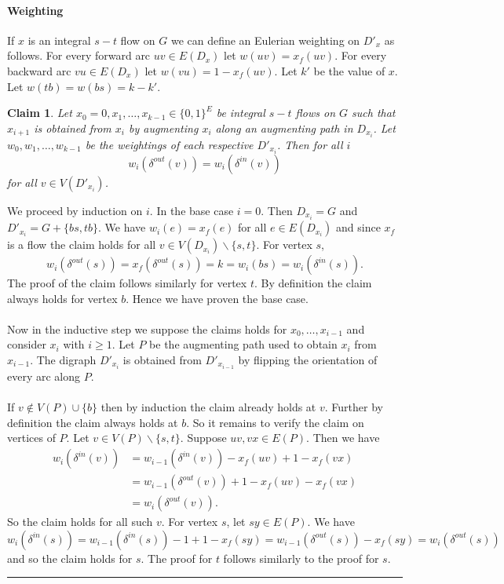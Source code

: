 \documentclass[letterpaper,12pt,oneside,onecolumn]{article}
\newenvironment{proof}{{\bf Proof:  }}{\hfill\rule{2mm}{2mm}}
\newtheorem{claim}[fact]{Claim}
\begin{document}
	\paragraph{Weighting}
	If $x$ is an integral $s-t$ flow on $G$ we can define an Eulerian weighting on $D'_x$ as follows. For every forward arc $uv \in E(D_x)$ let $w(uv) = x_f(uv)$. For every backward arc $vu \in E(D_x)$ let $w(vu) = 1- x_f(uv)$. Let $k'$ be the value of $x$. Let $w(tb) = w(bs) = k-k'$.
	\begin{claim}
		Let $x_0=0,x_1, \dots, x_{k-1}\in \{0,1\}^E$ be integral $s-t$ flows on $G$ such that $x_{i+1}$ is obtained from $x_i$ by augmenting $x_i$ along an augmenting path in $D_{x_i}$. Let $w_0,w_1,\dots, w_{k-1}$ be the weightings of each respective $D'_{x_i}$. Then for all $i$
		$$w_i(\delta^{out}(v)) = w_i(\delta^{in}(v))$$ for all $v \in V(D'_{x_i})$.
	\end{claim}
	\begin{proof}
		We proceed by induction on $i$. In the base case $i = 0$. Then $D_{x_i} = G$ and $D'_{x_i} = G + \{bs, tb\}$. We have $w_i(e) = x_f(e)$ for all $e \in E(D_{x_i})$ and since $x_f$ is a flow the claim holds for all $v \in V(D_{x_i})\backslash\{s,t\}$. For vertex $s$,
		$$w_i(\delta^{out}(s)) = x_f(\delta^{out}(s)) = k = w_i(bs) = w_i(\delta^{in}(s)).$$
		The proof of the claim follows similarly for vertex $t$. By definition the claim always holds for vertex $b$. Hence we have proven the base case.
		\paragraph{}
		Now in the inductive step we suppose the claims holds for $x_0, \dots, x_{i-1}$ and consider $x_i$ with $i \geq 1$. Let $P$ be the augmenting path used to obtain $x_i$ from $x_{i-1}$. The digraph $D'_{x_i}$ is obtained from $D'_{x_{i-1}}$ by flipping the orientation of every arc along $P$.
		
		\paragraph{} If $v \not\in V(P) \cup \{b\}$ then by induction the claim already holds at $v$. Further by definition the claim always holds at $b$. So it remains to verify the claim on vertices of $P$. Let $v \in V(P)\backslash\{s,t\}$. Suppose $uv, vx \in E(P)$. Then we have
		\begin{align*}
		w_i(\delta^{in}(v)) &= w_{i-1}(\delta^{in}(v)) -x_f(uv) + 1-x_f(vx)\\
		&=w_{i-1}(\delta^{out}(v)) + 1-x_f(uv) -x_f(vx) \\
		&=w_i(\delta^{out}(v)).
		\end{align*}
		So the claim holds for all such $v$. For vertex $s$, let $sy \in E(P)$. We have
		$$w_i(\delta^{in}(s)) = w_{i-1}(\delta^{in}(s)) -1 + 1-x_f(sy) = w_{i-1}(\delta^{out}(s)) -x_f(sy) = w_i(\delta^{out}(s))$$
		and so the claim holds for $s$. The proof for $t$ follows similarly to the proof for $s$.
	\end{proof}
\end{document}
